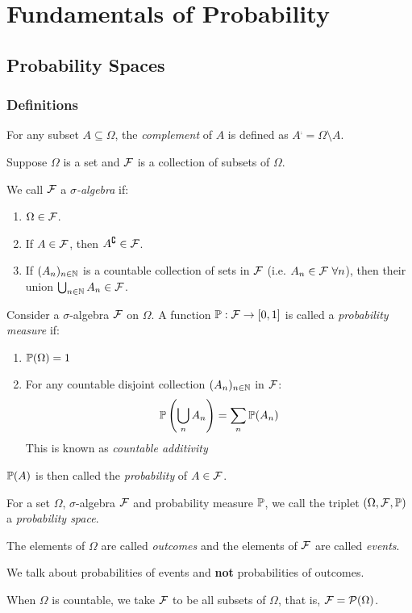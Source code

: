 \documentclass[../main.tex]{subfiles}
\begin{document}
\chapter{Fundamentals of Probability}
\section{Probability Spaces}
\subsection{Definitions}
\label{probabilitySpaceDef}
\begin{definition}
  For any subset $A \subseteq \Omega$, the \textit{complement} of $A$ is defined as $A^{\comp} = \Omega \setminus A$.
\end{definition}
\begin{definition}
  Suppose $\Omega$ is a set and $\salg$ is a collection of subsets of $\Omega$.

  We call $\salg$ a \textit{$\sigma$-algebra} if:
  \begin{enumerate}
    \item $\Omega \in \salg$.
    \item If $A \in \salg$, then $A^{\comp} \in \salg$.
    \item If $(A_n)_{n \in \N}$ is a countable collection of sets in $\salg$ (i.e. $A_n \in \salg\ \forall n$), then their union $\bigcup_{n \in \N} A_n \in \salg$.
  \end{enumerate}
\end{definition}
\begin{definition}
  Consider a $\sigma$-algebra $\salg$ on $\Omega$.
  A function $\P: \salg \to [0, 1]$ is called a \textit{probability measure} if:
  \begin{enumerate}
    \item $\P(\Omega) = 1$
    \item For any countable disjoint collection $(A_n)_{n \in \N}$ in $\salg$:
      \[
        \P\left(\bigcup_{n} A_n\right) = \sum_{n} \P(A_n)
      \]
      This is known as \textit{countable additivity}
  \end{enumerate}
  $\P(A)$ is then called the \textit{probability} of $A \in \salg$.
\end{definition}
\begin{definition}
  For a set $\Omega$, $\sigma$-algebra $\salg$ and probability measure $\P$, we call the triplet $(\Omega, \salg, \P)$ a \textit{probability space}.
\end{definition}
\begin{definition}
  The elements of $\Omega$ are called \textit{outcomes} and the elements of $\salg$ are called \textit{events}.
\end{definition}
We talk about probabilities of events and \textbf{not} probabilities of outcomes.
\begin{remark}
  When $\Omega$ is countable, we take $\salg$ to be all subsets of $\Omega$, that is, $\salg = \powerset{\Omega}$.
\end{remark}
\end{document}
